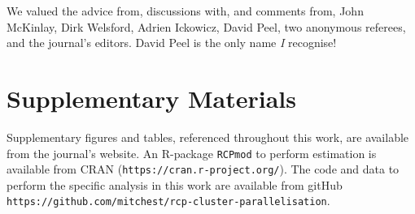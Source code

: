 \documentclass{statsoc}
\begin{document}
We valued the advice from, discussions with, and comments from, John McKinlay, Dirk Welsford, Adrien Ickowicz, David Peel, two anonymous referees, and the journal's editors. David Peel is the only name \textit{I} recognise!

\section*{Supplementary Materials}

Supplementary figures and tables, referenced throughout this work, are available from the journal's website. An R-package \verb|RCPmod| to perform estimation is available from CRAN (\verb|https://cran.r-project.org/|). The code and data to perform the specific analysis in this work are available from gitHub \verb|https://github.com/mitchest/rcp-cluster-parallelisation|.\vspace*{-8pt}



\end{document}
